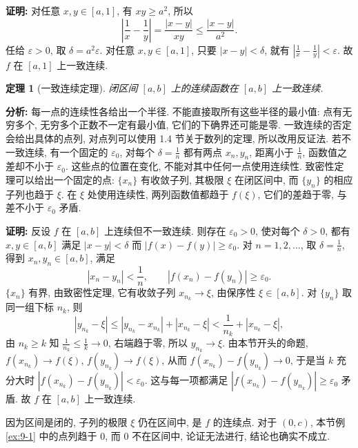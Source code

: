 \documentclass[UTF8,openany]{ctexbook}
\theoremstyle{chinesetextbook}
\newtheorem{theorem}{定理}[section]
\newenvironment{cnproof}{\par\indent\textbf{证明:} \ignorespaces}{\par}
\begin{document}
\begin{cnproof}
对任意 $x,y\in[a,1]$, 有 $xy\ge a^2$, 所以
\[
\left|\frac1x-\frac1y\right|=\frac{|x-y|}{xy}\le\frac{|x-y|}{a^2}.
\]
任给 $\varepsilon>0$, 取 $\delta=a^2\varepsilon$. 对任意 $x,y\in[a,1]$, 只要 $|x-y|<\delta$, 就有 $\displaystyle\left|\frac1x-\frac1y\right|<\varepsilon$. 故 $f$ 在 $[a,1]$ 上一致连续.
\end{cnproof}
\begin{theorem}[一致连续定理]
闭区间 $[a,b]$ 上的连续函数在 $[a,b]$ 上一致连续.
\end{theorem}
\par\indent\textbf{分析:} 每一点的连续性各给出一个半径. 不能直接取所有这些半径的最小值: 点有无穷多个, 无穷多个正数不一定有最小值, 它们的下确界还可能是零. 一致连续的否定会给出具体的点列, 对点列可以使用 1.4 节关于数列的定理, 所以改用反证法. 若不一致连续, 有一个固定的 $\varepsilon_0$, 对每个 $\displaystyle\delta=\frac1n$ 都有两点 $x_n,y_n$, 距离小于 $\displaystyle\frac1n$, 函数值之差却不小于 $\varepsilon_0$. 这些点的位置在变化, 不能对其中任何一点使用连续性. 致密性定理可以给出一个固定的点: $\{x_n\}$ 有收敛子列, 其极限 $\xi$ 在闭区间中, 而 $\{y_n\}$ 的相应子列也趋于 $\xi$. 在 $\xi$ 处使用连续性, 两列函数值都趋于 $f(\xi)$, 它们的差趋于零, 与差不小于 $\varepsilon_0$ 矛盾.
\begin{cnproof}
反设 $f$ 在 $[a,b]$ 上连续但不一致连续. 则存在 $\varepsilon_0>0$, 使对每个 $\delta>0$, 都有 $x,y\in[a,b]$ 满足 $|x-y|<\delta$ 而 $|f(x)-f(y)|\ge\varepsilon_0$. 对 $n=1,2,\ldots$, 取 $\displaystyle\delta=\frac1n$, 得到 $x_n,y_n\in[a,b]$, 满足
\[
|x_n-y_n|<\frac1n,\qquad|f(x_n)-f(y_n)|\ge\varepsilon_0.
\]
$\{x_n\}$ 有界, 由致密性定理, 它有收敛子列 $x_{n_k}\to\xi$, 由保序性 $\xi\in[a,b]$. 对 $\{y_n\}$ 取同一组下标 $n_k$, 则
\[
|y_{n_k}-\xi|\le|y_{n_k}-x_{n_k}|+|x_{n_k}-\xi|<\frac1{n_k}+|x_{n_k}-\xi|,
\]
由 $n_k\ge k$ 知 $\displaystyle\frac1{n_k}\le\frac1k\to0$, 右端趋于零, 所以 $y_{n_k}\to\xi$. 由本节开头的命题, $f(x_{n_k})\to f(\xi)$, $f(y_{n_k})\to f(\xi)$, 从而 $f(x_{n_k})-f(y_{n_k})\to0$, 于是当 $k$ 充分大时 $|f(x_{n_k})-f(y_{n_k})|<\varepsilon_0$. 这与每一项都满足 $|f(x_{n_k})-f(y_{n_k})|\ge\varepsilon_0$ 矛盾. 故 $f$ 在 $[a,b]$ 上一致连续.
\end{cnproof}
因为区间是闭的, 子列的极限 $\xi$ 仍在区间中, 是 $f$ 的连续点. 对于 $(0,c)$, 本节例\ref{ex:9-1} 中的点列趋于 $0$, 而 $0$ 不在区间中, 论证无法进行, 结论也确实不成立.
\end{document}

